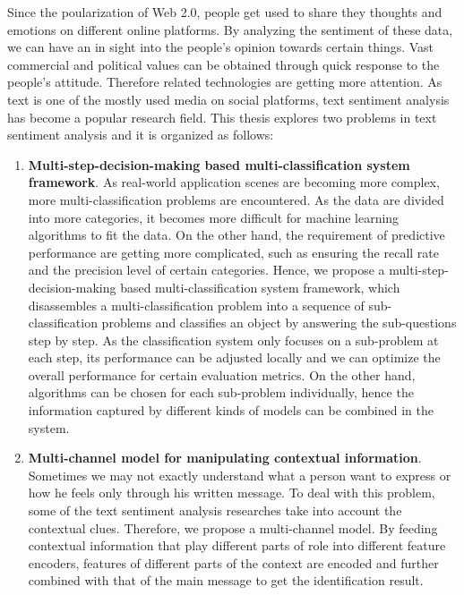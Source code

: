 \begin{eabstract}

Since the poularization of Web 2.0, people get used to share they thoughts and emotions on different online platforms. By analyzing the sentiment of these data, we can have an in sight into the people's opinion towards certain things. Vast commercial and political values can be obtained through quick response to the people's attitude. Therefore related technologies are getting more attention. As text is one of the mostly used media on social platforms, text sentiment analysis has become a popular research field. This thesis explores two problems in text sentiment analysis and it is organized as follows:

\begin{enumerate}

\item {\bf Multi-step-decision-making based multi-classification system framework}. As real-world application scenes are becoming more complex, more multi-classification problems are encountered. As the data are divided into more categories, it becomes more difficult for machine learning algorithms to fit the data. On the other hand, the requirement of predictive performance are getting more complicated, such as ensuring the recall rate and the precision level of certain categories. Hence, we propose a multi-step-decision-making based multi-classification system framework, which disassembles a multi-classification problem into a sequence of sub-classification problems and classifies an object by answering the sub-questions step by step. As the classification system only focuses on a sub-problem at each step, its performance can be adjusted locally and we can optimize the overall performance for certain evaluation metrics. On the other hand, algorithms can be chosen for each sub-problem individually, hence the information captured by different kinds of models can be combined in the system.

\item {\bf Multi-channel model for manipulating contextual information}. Sometimes we may not exactly understand what a person want to express or how he feels only through his written message. To deal with this problem, some of the text sentiment analysis researches take into account the contextual clues. Therefore, we propose a multi-channel model. By feeding contextual information that play different parts of role into different feature encoders, features of different parts of the context are encoded and further combined with that of the main message to get the identification result.


\end{enumerate}
\end{eabstract}
